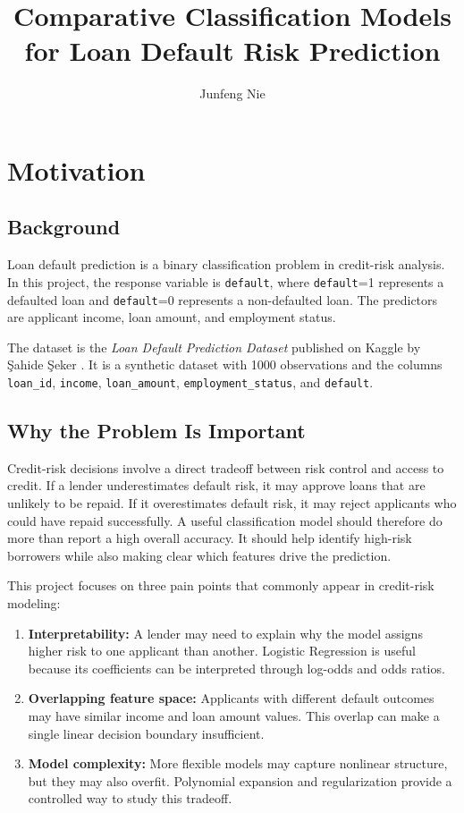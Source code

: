 \documentclass[12pt]{article}
\title{Comparative Classification Models for Loan Default Risk Prediction}
\author{Junfeng Nie}
\date{}
\begin{document}
\maketitle

\section{Motivation}

\subsection{Background}

Loan default prediction is a binary classification problem in credit-risk analysis. In this project, the response variable is \texttt{default}, where \texttt{default}=1 represents a defaulted loan and \texttt{default}=0 represents a non-defaulted loan. The predictors are applicant income, loan amount, and employment status.

The dataset is the \textit{Loan Default Prediction Dataset} published on Kaggle by Şahide Şeker \cite{seker_kaggle}. It is a synthetic dataset with 1000 observations and the columns \texttt{loan\_id}, \texttt{income}, \texttt{loan\_amount}, \texttt{employment\_status}, and \texttt{default}.

\subsection{Why the Problem Is Important}

Credit-risk decisions involve a direct tradeoff between risk control and access to credit. If a lender underestimates default risk, it may approve loans that are unlikely to be repaid. If it overestimates default risk, it may reject applicants who could have repaid successfully. A useful classification model should therefore do more than report a high overall accuracy. It should help identify high-risk borrowers while also making clear which features drive the prediction.

This project focuses on three pain points that commonly appear in credit-risk modeling:

\begin{enumerate}[label=(\roman*)]
    \item \textbf{Interpretability:} A lender may need to explain why the model assigns higher risk to one applicant than another. Logistic Regression is useful because its coefficients can be interpreted through log-odds and odds ratios.
    \item \textbf{Overlapping feature space:} Applicants with different default outcomes may have similar income and loan amount values. This overlap can make a single linear decision boundary insufficient.
    \item \textbf{Model complexity:} More flexible models may capture nonlinear structure, but they may also overfit. Polynomial expansion and regularization provide a controlled way to study this tradeoff.
\end{enumerate}
\end{document}
